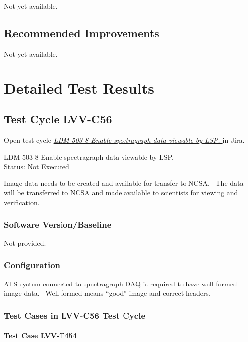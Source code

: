 \documentclass[DM,lsstdraft,STR,toc]{lsstdoc}
\begin{document}
Not yet available.

\subsection{Recommended Improvements}
\label{sect:recommendations}

Not yet available.

\newpage
\section{Detailed Test Results}
\label{sect:detailedtestresults}


  \subsection{Test Cycle LVV-C56 }

Open test cycle {\it \href{https://jira.lsstcorp.org/secure/Tests.jspa#/testrun/LVV-C56}{LDM-503-8 Enable spectragraph data viewable by LSP.
}} in Jira.

  LDM-503-8 Enable spectragraph data viewable by LSP.
\\
  Status: Not Executed

  Image data needs to be created and available for transfer to NCSA. ~The
data will be transferred to NCSA and made available to scientists for
viewing and verification.~ ~~


  \subsubsection{Software Version/Baseline}
    Not provided.

  \subsubsection{Configuration}
    ATS system connected to spectragraph DAQ is required to have well formed
image data. ~Well formed means ``good'' image and correct headers.
~\\[2\baselineskip]


  \subsubsection{Test Cases in LVV-C56 Test Cycle}


    \paragraph{Test Case LVV-T454 }\mbox{}\\
\end{document}
